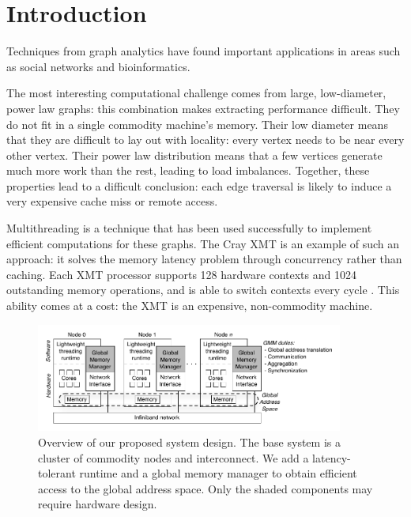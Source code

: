 \documentclass[10pt,nocopyrightspace,preprint]{sigplanconf}
\begin{document}
\section{Introduction}


Techniques from graph analytics have found important applications in
areas such as social networks and bioinformatics. 




The most interesting computational challenge comes from large,
low-diameter, power law graphs: this combination makes extracting
performance difficult. They do not fit in a single
commodity machine's memory. Their low diameter means that they are
difficult to lay out with locality: every vertex needs to be near every
other vertex. Their power law distribution means that a few vertices
generate much more work than the rest, leading to load
imbalances. Together, these properties lead to a
difficult conclusion: each edge traversal is likely to induce a very
expensive cache miss or remote access.

Multithreading is a technique that has been used successfully to
implement efficient computations for these graphs. The Cray XMT is an
example of such an approach: it solves the memory latency problem
through concurrency rather than caching. Each XMT processor supports
128 hardware contexts and 1024 outstanding memory operations, and is
able to switch contexts every cycle . This ability comes at a cost: the
XMT is an expensive, non-commodity machine. 


\begin{figure}[htbp]
  \begin{center}
    \includegraphics[width=0.9\textwidth]{figures/system-overview.pdf}
	\end{center}
	\caption{Overview of our proposed system design. The base
          system is a cluster of commodity nodes and interconnect. We
          add a latency-tolerant runtime and a global memory manager
          to obtain efficient access to the global address space. Only
          the shaded components may require hardware design.}
	\label{fig:system-overview}
\end{figure}
\end{document}
